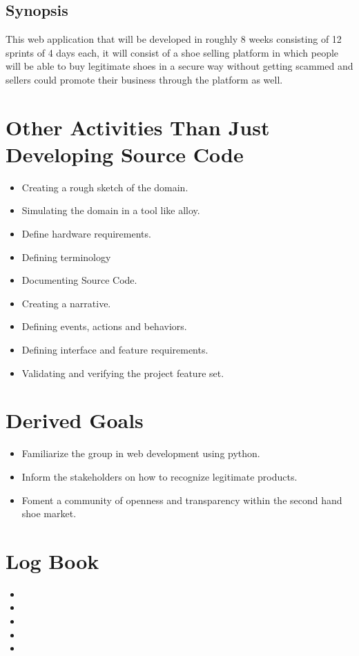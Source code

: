 \subsection{Synopsis}
This web application that will be developed in roughly 8 weeks consisting of 12 sprints of 4 days each, it will consist of a shoe selling platform in which people will be able to buy legitimate shoes in a secure way without getting scammed and sellers could promote their business through the platform as well.
\section{Other Activities Than Just Developing Source Code}
\begin{itemize}
  \item Creating a rough sketch of the domain.
  \item Simulating the domain in a tool like alloy.
  \item Define hardware requirements.
  \item Defining terminology
  \item Documenting Source Code.
  \item Creating a narrative.
  \item Defining events, actions and behaviors.
  \item Defining interface and feature requirements.
  \item Validating and verifying the project feature set.
\end{itemize}
\section{Derived Goals}
\begin{itemize}
  \item Familiarize the group in web development using python.
  \item Inform the stakeholders on how to recognize legitimate products.
  \item Foment a community of openness and transparency within the second hand shoe market.
\end{itemize}
\section{Log Book}
\begin{itemize}
  \item {}
  \item {}
  \item {}
  \item {}
  \item {}
\end{itemize}

